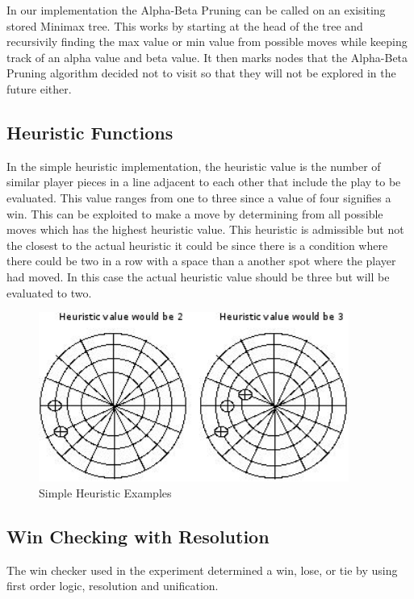 \documentclass[12pt,letterpaper]{article}
\begin{document}
In our implementation the Alpha-Beta Pruning can be called on an exisiting stored Minimax tree. This works by starting at the head of the tree and recursivily finding the max value or min value from possible moves while keeping track of an alpha value and beta value.  It then marks nodes that the Alpha-Beta Pruning algorithm decided not to visit so that they will not be explored in the future either. 


\subsection{Heuristic Functions}

In the simple heuristic implementation, the heuristic value is the number of similar player pieces in a line adjacent to each other that include the play to be evaluated. This value ranges from one to three since a value of four signifies a win. This can be exploited to make a move by determining from all possible moves which has the highest heuristic value. This heuristic is admissible but not the closest to the actual heuristic it could be since there is a condition where there could be two in a row with a space than a another spot where the player had moved. In this case the actual heuristic value should be three but will be evaluated to two.

\begin{figure}[h]
\begin{center}
\includegraphics[width=4in]{heu.png}
\end{center}
\caption{Simple Heuristic Examples}
\label{heuristicExample}
\end{figure}

\subsection{Win Checking with Resolution}
The win checker used in the experiment determined a win, lose, or tie by using first order logic, resolution and unification.
\end{document}

